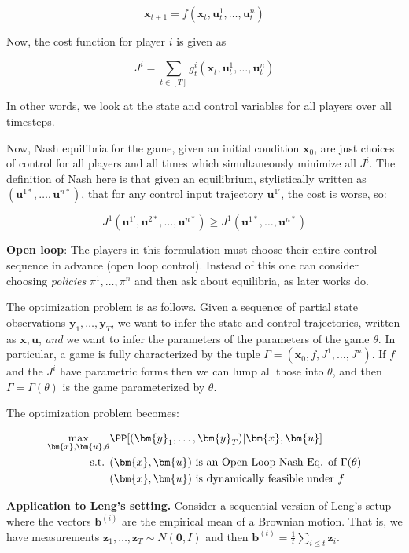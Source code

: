 $$\bm{x}_{t+1} = f(\bm{x}_t, \bm{u}_t^1, \dots, \bm{u}_t^n)$$

Now, the cost function for player $i$ is given as 

$$J^i = \sum_{t \in [T]} g_t^i(\bm{x}_t, \bm{u}_t^1, \dots, \bm{u}_t^n)$$

In other words, we look at the state and control variables for all players over all timesteps. 

Now, Nash equilibria for the game, given an initial condition $\bm{x}_0$, are just choices of control for all players and all times which simultaneously minimize all $J^i$. The definition of Nash here is that given an equilibrium, stylistically written as $(\bm{u}^{1 *}, \dots, \bm{u}^{n *})$, that for any control input trajectory $\bm{u}^{1 \prime}$, the cost is worse, so: 

$$
J^1(\bm{u}^{1 \prime}, \bm{u}^{2 *}, \dots, \bm{u}^{n *}) \geq J^1(\bm{u}^{1 *}, \dots, \bm{u}^{n *})
$$

{\bf Open loop}: The players in this formulation must choose their entire control sequence in advance (open loop control). Instead of this one can consider choosing {\em policies} $\pi^1, \dots, \pi^n$ and then ask about equilibria, as later works do. 

The optimization problem is as follows. Given a sequence of partial state observations $\bm{y}_1, \dots, \bm{y}_T$, we want to infer the state and control trajectories, written as $\bm{x}, \bm{u}$, {\em and} we want to infer the parameters of the parameters of the game $\theta$. In particular, a game is fully characterized by the tuple $\Gamma = (\bm{x}_0, f, J^1, \dots, J^n)$. If $f$ and the $J^i$ have parametric forms then we can lump all those into $\theta$, and then $\Gamma = \Gamma(\theta)$ is the game parameterized by $\theta$. 

The optimization problem becomes: 

\begin{align}
\max\limits_{\bm{x}, \bm{u}, \theta} 
&\PP[(\bm{y}_1, \dots, \bm{y}_T)| \bm{x}, \bm{u}] \\
\text{s.t. } &(\bm{x}, \bm{u}) \text{ is an Open Loop Nash Eq. of } \Gamma(\theta) \\
&(\bm{x}, \bm{u}) \text{ is dynamically feasible under } f
 \end{align} 

{\bf Application to Leng's setting.} Consider a sequential version of Leng's setup where the vectors $\bm{b}^{(i)}$ are the empirical mean of a Brownian motion. That is, we have measurements $\bm{z}_1, \dots, \bm{z}_T \sim N(\bm{0}, I)$ and then $\bm{b}^{(t)} = \frac 1 t \sum_{i \leq t} \bm{z}_i$. 

